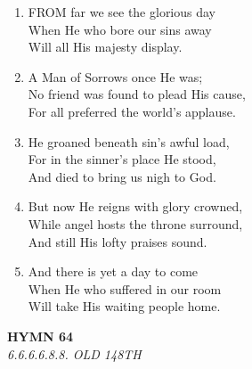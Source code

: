 \documentclass[11pt,a4paper]{article}
\begin{document}
\begin{enumerate}
    \item FROM far we see the glorious day \\
        When He who bore our sins away \\
        Will all His majesty display.

    \item A Man of Sorrows once He was; \\
        No friend was found to plead His cause, \\
        For all preferred the world's applause.

    \item He groaned beneath sin's awful load, \\
        For in the sinner's place He stood, \\
        And died to bring us nigh to God.

    \item But now He reigns with glory crowned, \\
        While angel hosts the throne surround, \\
        And still His lofty praises sound.

    \item And there is yet a day to come \\
        When He who suffered in our room \\
        Will take His waiting people home.

\end{enumerate}

\newpage
\begin{center}
    {\Large \textbf{HYMN 64}}
    \\
    \textit{6.6.6.6.8.8. OLD 148TH}
\end{center}
\vspace{1em}
\end{document}
